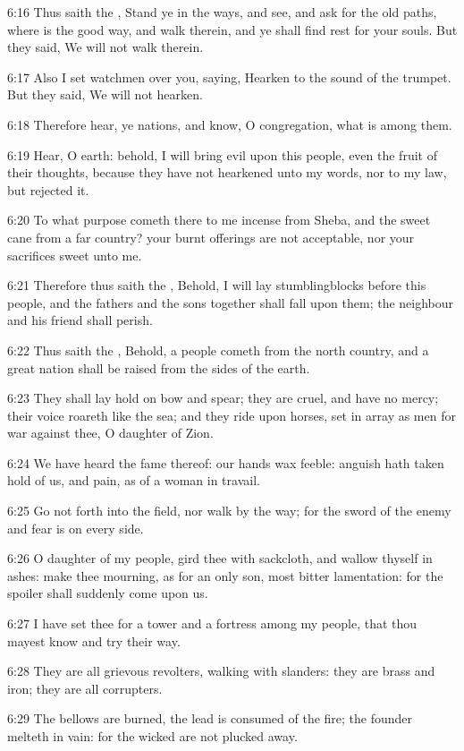 6:16 Thus saith the \LORD, Stand ye in the ways, and see, and ask for
the old paths, where is the good way, and walk therein, and ye shall
find rest for your souls. But they said, We will not walk therein.

6:17 Also I set watchmen over you, saying, Hearken to the sound of the
trumpet. But they said, We will not hearken.

6:18 Therefore hear, ye nations, and know, O congregation, what is
among them.

6:19 Hear, O earth: behold, I will bring evil upon this people, even
the fruit of their thoughts, because they have not hearkened unto my
words, nor to my law, but rejected it.

6:20 To what purpose cometh there to me incense from Sheba, and the
sweet cane from a far country? your burnt offerings are not
acceptable, nor your sacrifices sweet unto me.

6:21 Therefore thus saith the \LORD, Behold, I will lay stumblingblocks
before this people, and the fathers and the sons together shall fall
upon them; the neighbour and his friend shall perish.

6:22 Thus saith the \LORD, Behold, a people cometh from the north
country, and a great nation shall be raised from the sides of the
earth.

6:23 They shall lay hold on bow and spear; they are cruel, and have no
mercy; their voice roareth like the sea; and they ride upon horses,
set in array as men for war against thee, O daughter of Zion.

6:24 We have heard the fame thereof: our hands wax feeble: anguish
hath taken hold of us, and pain, as of a woman in travail.

6:25 Go not forth into the field, nor walk by the way; for the sword
of the enemy and fear is on every side.

6:26 O daughter of my people, gird thee with sackcloth, and wallow
thyself in ashes: make thee mourning, as for an only son, most bitter
lamentation: for the spoiler shall suddenly come upon us.

6:27 I have set thee for a tower and a fortress among my people, that
thou mayest know and try their way.

6:28 They are all grievous revolters, walking with slanders: they are
brass and iron; they are all corrupters.

6:29 The bellows are burned, the lead is consumed of the fire; the
founder melteth in vain: for the wicked are not plucked away.

